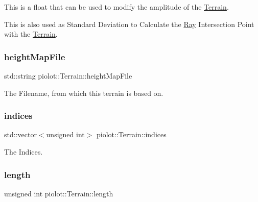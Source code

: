This is a float that can be used to modify the amplitude of the \mbox{\hyperlink{classpiolot_1_1_terrain}{Terrain}}. 

This is also used as Standard Deviation to Calculate the \mbox{\hyperlink{classpiolot_1_1_ray}{Ray}} Intersection Point with the \mbox{\hyperlink{classpiolot_1_1_terrain}{Terrain}}. \mbox{\label{classpiolot_1_1_terrain_a75cfcac6fb95fb3c63def8362ce393d0}} 
\subsubsection{\texorpdfstring{height\+Map\+File}{heightMapFile}}
{\footnotesize\ttfamily std\+::string piolot\+::\+Terrain\+::height\+Map\+File\hspace{0.3cm}{\ttfamily [private]}}



The Filename, from which this terrain is based on. 

\mbox{\label{classpiolot_1_1_terrain_a3f6ce2a18736eccd598931c72aeaf4bc}} 
\subsubsection{\texorpdfstring{indices}{indices}}
{\footnotesize\ttfamily std\+::vector$<$unsigned int$>$ piolot\+::\+Terrain\+::indices\hspace{0.3cm}{\ttfamily [private]}}



The Indices. 

\mbox{\label{classpiolot_1_1_terrain_adfe24e50e102f6c0dd424e2e7f376f15}} 
\subsubsection{\texorpdfstring{length}{length}}
{\footnotesize\ttfamily unsigned int piolot\+::\+Terrain\+::length\hspace{0.3cm}{\ttfamily [private]}}

